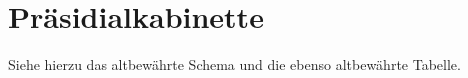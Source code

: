 \section{Präsidialkabinette}
\label{sec:praes-kab}

Siehe hierzu das altbewährte Schema und die ebenso altbewährte
Tabelle.

\endinput
